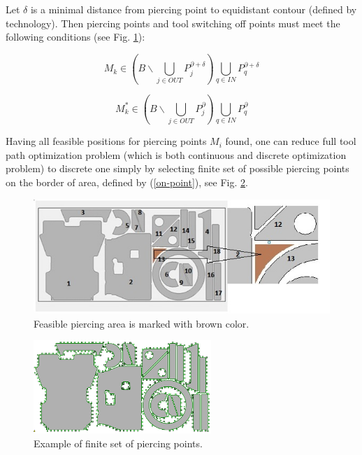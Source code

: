 \documentclass{../download/tPRS2e}
\begin{document}
Let $\delta$  is a minimal distance from piercing point to equidistant contour (defined by technology).
Then piercing points and tool switching off points must meet the following conditions (see Fig. \ref{piercing-area}):

\begin{equation} \label{on-point}
M_k \in
( B \backslash \bigcup_{j \in OUT} P^{\partial + \delta}_j ) \bigcup_{q \in IN} P^{\partial + \delta}_q
\end{equation}

\begin{equation} \label{off-point}
M_k^* \in
( B \backslash \bigcup_{j \in OUT} P^\partial_j ) \bigcup_{q \in IN} P^\partial_q
\end{equation}

Having all feasible positions for piercing points $M_i$ found,
one can reduce full tool path optimization problem
(which is both continuous and discrete optimization problem)
to discrete one simply by selecting finite set of possible piercing points on the border of area,
defined by (\ref{on-point}), see Fig. \ref{discrete}.

\begin{figure}
\begin{center}
\includegraphics[width=\textwidth]{ppc.jpeg}
\caption{Feasible piercing area is marked with brown color.} \label{piercing-area}
\end{center}
\end{figure}

\begin{figure}
\begin{center}
\includegraphics[width=0.6\textwidth]{discrete.png}
\caption{Example of finite set of piercing points.} \label{discrete}
\end{center}
\end{figure}
\end{document}
